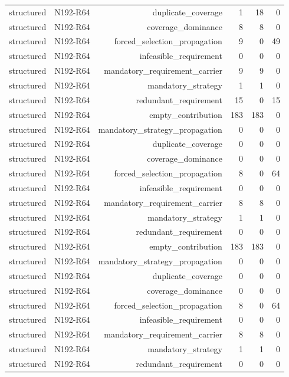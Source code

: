 {\begin{longtable}{lrrrrr}
structured & N192-R64 & duplicate\_coverage & 1 & 18 & 0 \\
structured & N192-R64 & coverage\_dominance & 8 & 8 & 0 \\
structured & N192-R64 & forced\_selection\_propagation & 9 & 0 & 49 \\
structured & N192-R64 & infeasible\_requirement & 0 & 0 & 0 \\
structured & N192-R64 & mandatory\_requirement\_carrier & 9 & 9 & 0 \\
structured & N192-R64 & mandatory\_strategy & 1 & 1 & 0 \\
structured & N192-R64 & redundant\_requirement & 15 & 0 & 15 \\
structured & N192-R64 & empty\_contribution & 183 & 183 & 0 \\
structured & N192-R64 & mandatory\_strategy\_propagation & 0 & 0 & 0 \\
structured & N192-R64 & duplicate\_coverage & 0 & 0 & 0 \\
structured & N192-R64 & coverage\_dominance & 0 & 0 & 0 \\
structured & N192-R64 & forced\_selection\_propagation & 8 & 0 & 64 \\
structured & N192-R64 & infeasible\_requirement & 0 & 0 & 0 \\
structured & N192-R64 & mandatory\_requirement\_carrier & 8 & 8 & 0 \\
structured & N192-R64 & mandatory\_strategy & 1 & 1 & 0 \\
structured & N192-R64 & redundant\_requirement & 0 & 0 & 0 \\
structured & N192-R64 & empty\_contribution & 183 & 183 & 0 \\
structured & N192-R64 & mandatory\_strategy\_propagation & 0 & 0 & 0 \\
structured & N192-R64 & duplicate\_coverage & 0 & 0 & 0 \\
structured & N192-R64 & coverage\_dominance & 0 & 0 & 0 \\
structured & N192-R64 & forced\_selection\_propagation & 8 & 0 & 64 \\
structured & N192-R64 & infeasible\_requirement & 0 & 0 & 0 \\
structured & N192-R64 & mandatory\_requirement\_carrier & 8 & 8 & 0 \\
structured & N192-R64 & mandatory\_strategy & 1 & 1 & 0 \\
structured & N192-R64 & redundant\_requirement & 0 & 0 & 0 \\

\end{longtable}}
